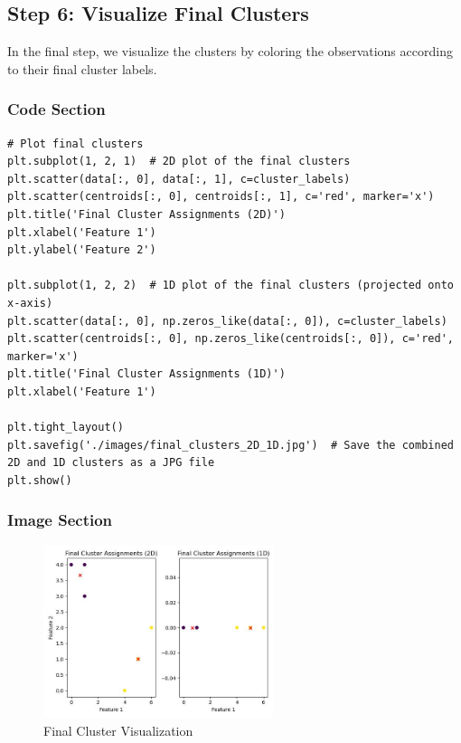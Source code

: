 \documentclass{exam}
\begin{document}
\newpage

\subsection{Step 6: Visualize Final Clusters}

In the final step, we visualize the clusters by coloring the observations according to their final cluster labels.

\subsubsection*{Code Section}

\begin{verbatim}
# Plot final clusters
plt.subplot(1, 2, 1)  # 2D plot of the final clusters
plt.scatter(data[:, 0], data[:, 1], c=cluster_labels)
plt.scatter(centroids[:, 0], centroids[:, 1], c='red', marker='x')
plt.title('Final Cluster Assignments (2D)')
plt.xlabel('Feature 1')
plt.ylabel('Feature 2')

plt.subplot(1, 2, 2)  # 1D plot of the final clusters (projected onto x-axis)
plt.scatter(data[:, 0], np.zeros_like(data[:, 0]), c=cluster_labels)
plt.scatter(centroids[:, 0], np.zeros_like(centroids[:, 0]), c='red', marker='x')
plt.title('Final Cluster Assignments (1D)')
plt.xlabel('Feature 1')

plt.tight_layout()
plt.savefig('./images/final_clusters_2D_1D.jpg')  # Save the combined 2D and 1D clusters as a JPG file
plt.show()
\end{verbatim}

\subsubsection*{Image Section}

\begin{figure}[h!]
    \centering
    \includegraphics[width=0.6\textwidth]{images/final_clusters_2D_1D.jpg}
    \caption{Final Cluster Visualization}
    \label{fig:final_cluster_visualization}
\end{figure}
\end{document}
